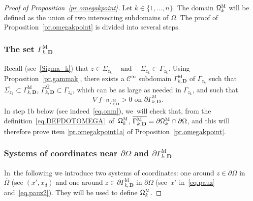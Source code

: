 \documentclass[JEP,XML,SOM,Unicode,NoEqCountersInSection,NoFloatCountersInSection,published]{cedram}
\newcommand{\quand}{\quad\text{and}\quad}
\newcommand{\mbf}[1]{\mathbf{#1}}
\let\pa\partial
\theoremstyle{plain}
\theoremstyle{definition}
\begin{document}
\begin{proof}[Proof of Proposition~\ref{pr.omegakpoint}] Let $k\in \{1,\ldots,n\}$. The domain $\mathsf \Omega_k^{\textsc{M}}$ will be defined as the union of two intersecting subdomains of $\Omega$. The proof of Proposition~\ref{pr.omegakpoint} is divided into several steps.



\subsubsection*{The set $\Gamma_{k,\mbf D}^{\text{M}}$} Recall
(see~\eqref{Sigma_k}) that
$
z\in \Sigma_{z_k} \ \quand \ \overline{\Sigma_{z_k} }\subset \Gamma_{z_k}$.
Using Proposition~\ref{pr.gammak}, there exists a $\mathcal
C^\infty$ subdomain $\Gamma_{k,\mbf D}^{\text{M}}$ of $\Gamma_{z_k}$
such that $\overline{\Sigma_{z_k}}\subset \Gamma_{k,\mbf
D}^{\text{M}}$, $\overline{\Gamma_{k,\mbf D}^{\text{M}}}\subset
\Gamma_{z_k}$, which can be as large as needed in $\Gamma_{z_k}$, and
such that
\begin{equation}\label{eq.derivee_normale_positive}
\nabla f\cdot \mathsf n_{ \Gamma_{k,\mbf D}^{\text{M}} }>0 \text{ on } \pa \Gamma_{k,\mbf D}^{\text{M}}.
\end{equation}
In step 1b below (see indeed~\eqref{eq.onm}), we~will check that,
from the definition~\eqref{eq.DEFDOTOMEGA}~of~$\mathsf
\Omega_k^{\textsc{M}}$, $\overline{\Gamma_{k,\mbf D}^{\text{M}}}=
\pa \mathsf \Omega_k^{\textsc{M}}\cap \partial \Omega$, and this
will therefore prove item \eqref{pr.omegakpoint1a} of Proposition~\ref{pr.omegakpoint}.

\subsubsection*{Systems of coordinates near $\partial \Omega$ and $\pa \Gamma_{k,\mbf D}^{\text{M}}$}
In~the following we introduce two systems of coordinates: one around $z\in \partial \Omega$ in $\overline \Omega$ (see $(x',x_d)$ and one around $z\in \pa \Gamma_{k,\mbf D}^{\text{M}}$ in $\partial \Omega$ (see~$x'$ in~\eqref{eq.pauz} and~\eqref{eq.pauz2}). They will be used to define $\mathsf \Omega_k^{\textsc{M}}$.


\end{proof}
\end{document}
